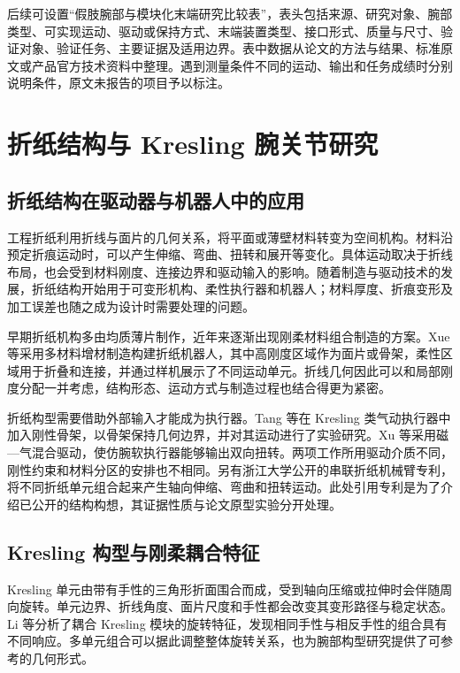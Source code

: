 
后续可设置“假肢腕部与模块化末端研究比较表”，表头包括来源、研究对象、腕部类型、可实现运动、驱动或保持方式、末端装置类型、接口形式、质量与尺寸、验证对象、验证任务、主要证据及适用边界。表中数据从论文的方法与结果、标准原文或产品官方技术资料中整理。遇到测量条件不同的运动、输出和任务成绩时分别说明条件，原文未报告的项目予以标注。

\section{折纸结构与 Kresling 腕关节研究}

\subsection{折纸结构在驱动器与机器人中的应用}

工程折纸利用折线与面片的几何关系，将平面或薄壁材料转变为空间机构。材料沿预定折痕运动时，可以产生伸缩、弯曲、扭转和展开等变化。具体运动取决于折线布局，也会受到材料刚度、连接边界和驱动输入的影响。随着制造与驱动技术的发展，折纸结构开始用于可变形机构、柔性执行器和机器人；材料厚度、折痕变形及加工误差也随之成为设计时需要处理的问题。

早期折纸机构多由均质薄片制作，近年来逐渐出现刚柔材料组合制造的方案。Xue 等采用多材料增材制造构建折纸机器人，其中高刚度区域作为面片或骨架，柔性区域用于折叠和连接，并通过样机展示了不同运动单元\cite{Xue2024RigidFlexibleOrigami}。折线几何因此可以和局部刚度分配一并考虑，结构形态、运动方式与制造过程也结合得更为紧密。

折纸构型需要借助外部输入才能成为执行器。Tang 等在 Kresling 类气动执行器中加入刚性骨架，以骨架保持几何边界，并对其运动进行了实验研究\cite{Tang2024KreslingRigidSkeleton}。Xu 等采用磁—气混合驱动，使仿腕软执行器能够输出双向扭转\cite{Xu2024WristInspiredKresling}。两项工作所用驱动介质不同，刚性约束和材料分区的安排也不相同。另有浙江大学公开的串联折纸机械臂专利，将不同折纸单元组合起来产生轴向伸缩、弯曲和扭转运动\cite{Zhejiang2026SerialOrigamiArmPatent}。此处引用专利是为了介绍已公开的结构构想，其证据性质与论文原型实验分开处理。

\subsection{Kresling 构型与刚柔耦合特征}

Kresling 单元由带有手性的三角形折面围合而成，受到轴向压缩或拉伸时会伴随周向旋转。单元边界、折线角度、面片尺度和手性都会改变其变形路径与稳定状态。Li 等分析了耦合 Kresling 模块的旋转特征，发现相同手性与相反手性的组合具有不同响应\cite{Li2020CoupledKresling}。多单元组合可以据此调整整体旋转关系，也为腕部构型研究提供了可参考的几何形式。

